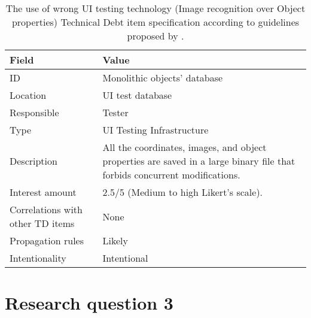 	\begin{table}[!htbp]
		\centering
		\tabulinesep=1.2mm
		\begin{tabu} to \textwidth {|X|X[3]|}
			
			\hline
			\textbf{Field} & \textbf{Value} \\ 
			\hline
			
			ID & Monolithic objects' database\\
			\hline
			
			Location & UI test database \\
			\hline
			
			Responsible & Tester \\
			\hline
			
			Type & UI Testing Infrastructure \\
			\hline	
			
			Description & All the coordinates, images, and object properties are saved in a large binary file that forbids concurrent modifications.\\
			\hline
			
			
			
			Interest amount &  2.5/5 (Medium to high Likert's scale). \\
			\hline
			
			
			
			Correlations with other TD items & None\\
			\hline 	 
			
			
			
			Propagation rules & Likely\\
			\hline
			
			Intentionality & Intentional \\
			\hline 	 	
			
		\end{tabu}
		\caption[Use of wrong UI testing technology - Image recognition over Objects' properties - TD item specification]{The use of wrong UI testing technology (Image recognition over Object properties) Technical Debt item specification according to guidelines proposed by \cite{mapping_study_td}.}
		\label{tab:res-monolithic-db}
	\end{table}
	

\section{Research question 3} \label{sec:res_rq3}


